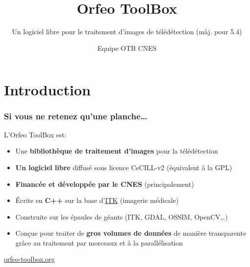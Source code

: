 \documentclass[8pt]{beamer}
\title{Orfeo ToolBox}
\subtitle{Un logiciel libre pour le traitement d'images de télédétection (màj.  pour 5.4)}
\author{Equipe OTB CNES}%
\date{}
\begin{document}
\begin{frame}
\titlepage
\end{frame}

\section*{Introduction}

\begin{frame}
\frametitle{Si vous ne retenez qu'une planche\ldots}
\begin{block}{L'Orfeo ToolBox est:}
\begin{itemize}
\item Une \textbf{bibliothèque de traitement d'images} pour la télédétection
\item \textbf{Un logiciel libre} diffusé sous licence CeCILL-v2 (équivalent à la GPL)
\item \textbf{Financée et développée par le CNES} (principalement)
\item Écrite en \textbf{C++} sur la base d'\href{www.itk.org}{ITK} (imagerie médicale)
\item Construite sur les épaules de géants (ITK, GDAL, OSSIM, OpenCV\ldots)
\item Conçue pour traiter de \textbf{gros volumes de données} de manière transparente grâce au traitement par morceaux et à la parallélisation
\end{itemize}
\end{block}

\begin{center}
{\huge\textcolor{red}{\href{http://www.orfeo-toolbox.org}{orfeo-toolbox.org}}}
\end{center}

\end{frame}
\end{document}
